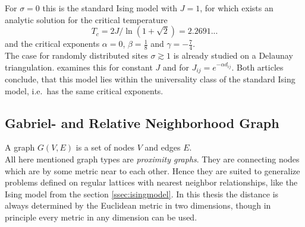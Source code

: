     For \(\sigma = 0\) this is the standard Ising model with \(J = 1\),
    for which exists an analytic solution \cite{Onsager1944} for the
    critical temperature
    \begin{equation}
        T_c = 2J/\ln(1+\sqrt 2) = 2.2691...
        \label{eq:exactTc}
    \end{equation}
    and the critical exponents \(\alpha = 0\), \(\beta = \frac{1}{8}\)
    and \(\gamma = -\frac{7}{4}\).\\
    The case for randomly distributed sites \(\sigma \gtrsim 1\) is
    already studied on a Delaunay triangulation. \cite{Janke1994} examines
    this for constant \(J\) and \cite{Lima2000} for \(J_{ij} = e^{-\alpha d_{ij}}\).
    Both articles conclude, that this model lies within the universality
    class of the standard Ising model, i.e.\ has the same critical
    exponents.

\subsection{Gabriel- and Relative Neighborhood Graph}
\label{ssec:graphtypes}
    A graph \(G(V,E)\) is a set of nodes \(V\) and edges \(E\).\\
    All here mentioned graph types are \emph{proximity graphs}. They are
    connecting nodes which are by some metric near to each other.
    Hence they are suited to generalize problems defined on regular
    lattices with nearest neighbor relationships, like the Ising model
    from the section \ref{ssec:isingmodel}.
    In this thesis the distance is always determined by the Euclidean
    metric in two dimensions, though in principle every metric in any
    dimension can be used.\\

